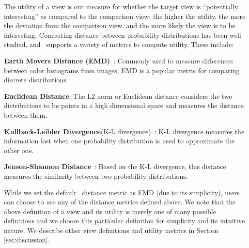 The utility of a view is our measure for whether the target view is
``potentially interesting'' as compared to the comparison view:
the higher the utility, the more the deviation
from the comparison view, and the more likely the view is to be interesting.
Computing distance between probability distributions has
been well studied, and \SeeDB\ supports a variety of metrics
to compute utility. These include:
\squishlist
  \item {\bf Earth Movers Distance (EMD)}~\cite{wikipedia-prob-dist}: Commonly used to
  measure differences between color histograms from images, EMD is a popular metric for comparing
  discrete distributions.
  \item {\bf Euclidean Distance}: The L2 norm or
  Euclidean distance considers the two distributions to be points in a high
  dimensional space and measures the distance between them.
  \item {\bf Kullback-Leibler Divergence}(K-L divergence)~\cite{wikipedia-KL}:
  K-L divergence measures the information lost when one probability distribution is used to approximate
  the other one.
  \item {\bf Jenson-Shannon Distance}~\cite{wikipedia-JS,entropy-vis}: Based on
  the K-L divergence, this distance measures the similarity between two probability distributions.
\squishend

While we set the default \SeeDB\ distance metric as EMD (due to its simplicity),
users can choose to use any of the distance metrics defined above. We note that
the above definition of a view and its utility is merely one of many possible
definitions and we choose this particular definition for simplicity and its
intuitive nature. We describe other view definitions and utility metrics in
Section \ref{sec:discussion}.


